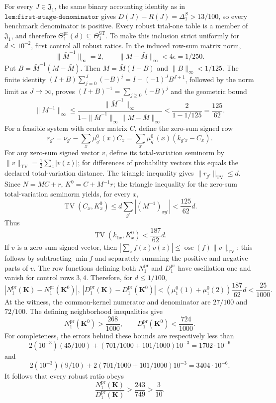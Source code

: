 For every \(J\in\mathfrak J_1\), the same binary accounting identity as in \(\texttt{lem:first-stage-denominator}\) gives \(D(J)-R(J)=\Delta_1^S>13/100\), so every benchmark denominator is positive.  Every robust trial-one table is a member of \(\mathfrak J_1\), and therefore \(\Theta_1^{\mathrm{pr}}(d)\subseteq\Theta_1^{\mathrm{ST}}\).  To make this inclusion strict uniformly for \(d\le10^{-2}\), first control all robust ratios.  In the induced row-sum matrix norm,
\[
 \|\bar M^{-1}\|_\infty=2,
 \qquad
 \|M-\bar M\|_\infty<4\epsilon=1/250.
\]
Put \(B=\bar M^{-1}(M-\bar M)\).  Then \(M=\bar M(I+B)\) and \(\|B\|_\infty<1/125\).  The finite identity
\((I+B)\sum_{j=0}^J(-B)^j=I+(-1)^JB^{J+1}\), followed by the norm limit as \(J\to\infty\), proves \((I+B)^{-1}=\sum_{j\ge0}(-B)^j\) and the geometric bound
\[
 \|M^{-1}\|_\infty
 \le \frac{\|\bar M^{-1}\|_\infty}
 {1-\|\bar M^{-1}\|_\infty\|M-\bar M\|_\infty}
 <\frac{2}{1-1/125}=\frac{125}{62}.
\]
For a feasible system with center matrix \(C\), define the zero-sum signed row
\[
 r_{g'}=\nu_{g'}-\sum_x\mu_{g'}^0(x)C_x
 =\sum_x\mu_{g'}^0(x)(k_{g'x}-C_x).
\]
For any zero-sum signed vector \(v\), define its total-variation seminorm by
\(\|v\|_{\mathrm{TV}}=\tfrac12\sum_z|v(z)|\); for differences of probability vectors this equals the declared total-variation distance.  The triangle inequality gives \(\|r_{g'}\|_{\mathrm{TV}}\le d\).  Since \(N=MC+r\),
\(K^0=C+M^{-1}r\); the triangle inequality for the zero-sum total-variation seminorm yields, for every \(x\),
\[
 \operatorname{TV}(C_x,K^0_x)
 \le d\sum_{g'}|(M^{-1})_{xg'}|
 <\frac{125}{62}d.
\]
Thus
\[
 \operatorname{TV}(k_{1x},K^0_x)<\frac{187}{62}d.
\]
If \(v\) is a zero-sum signed vector, then
\(|\sum_z f(z)v(z)|\le\operatorname{osc}(f)\|v\|_{\mathrm{TV}}\); this follows by subtracting \(\min f\) and separately summing the positive and negative parts of \(v\).  The row functions defining both \(N_1^{\mathrm{pr}}\) and \(D_1^{\mathrm{pr}}\) have oscillation one and vanish for control rows \(3,4\).  Therefore, for \(d\le1/100\),
\[
 |N_1^{\mathrm{pr}}(\mathbf K)-N_1^{\mathrm{pr}}(\mathbf K^0)|,
 \ |D_1^{\mathrm{pr}}(\mathbf K)-D_1^{\mathrm{pr}}(\mathbf K^0)|
 <(\mu_1^0(1)+\mu_1^0(2))\frac{187}{62}d<\frac{25}{1000}.
\]
At the witness, the common-kernel numerator and denominator are \(27/100\) and \(72/100\).  The defining neighborhood inequalities give
\[
 N_1^{\mathrm{pr}}(\mathbf K^0)>\frac{268}{1000},
 \qquad
 D_1^{\mathrm{pr}}(\mathbf K^0)<\frac{724}{1000}.
\]
For completeness, the errors behind these bounds are respectively less than
\[
 2(10^{-3})(45/100)+(701/1000+101/1000)10^{-3}=1702\cdot10^{-6}
\]
and
\[
 2(10^{-3})(9/10)+2(701/1000+101/1000)10^{-3}=3404\cdot10^{-6}.
\]
It follows that every robust ratio obeys
\[
 \frac{N_1^{\mathrm{pr}}(\mathbf K)}{D_1^{\mathrm{pr}}(\mathbf K)}
 >\frac{243}{749}>\frac3{10}.
\]

